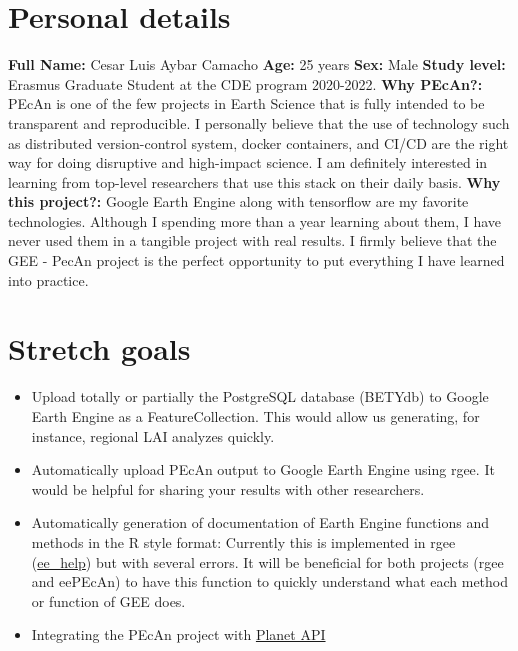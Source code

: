 \documentclass{eepecan}
\begin{document}
	\section{Personal details}	
	\textbf{Full Name:} Cesar Luis Aybar Camacho \newline \newline
	\textbf{Age:} 25 years \newline \newline
	\textbf{Sex:} Male \newline \newline
	\textbf{Study level:} Erasmus Graduate Student at the CDE program 2020-2022. \newline \newline
	\textbf{Why PEcAn?:} PEcAn is one of the few projects in Earth Science that is fully intended to be transparent and reproducible. I personally believe that the use of technology such as distributed version-control system, docker containers, and CI/CD are the right way for doing disruptive and high-impact science. I am definitely interested in learning from top-level researchers that use this stack on their daily basis. \newline \newline
	\textbf{Why this project?:} Google Earth Engine along with tensorflow are my favorite technologies. Although I spending more than a year learning about them, I have never used them in a tangible project with real results. I firmly believe that the GEE - PecAn project is the perfect opportunity to put everything I have learned into practice. \newline \newline

	\section{Stretch goals}
	\begin{itemize}
		\item Upload totally or partially the PostgreSQL database (BETYdb) to Google Earth Engine as a FeatureCollection. This would allow us generating, for instance, regional LAI analyzes quickly. 
		\item Automatically upload PEcAn output to Google Earth Engine using rgee. It would be helpful for sharing your results with other researchers.
		\item Automatically generation of documentation of Earth Engine functions and methods in the R style format: Currently this is implemented in rgee (\href{https://github.com/csaybar/rgee/blob/master/R/ee_help.R}{ee\_help}) but with several errors. It will be beneficial for both projects (rgee and eePEcAn) to have this function to quickly understand what each method or function of GEE does.
		\item Integrating the PEcAn project with \href{https://developers.planet.com/docs/data/}{Planet API}
	\end{itemize}
\end{document}
